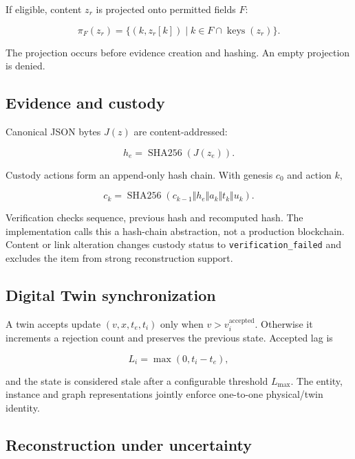 ﻿\documentclass[11pt,a4paper]{article}
\newcommand{\code}[1]{\texttt{#1}}
\begin{document}
If eligible, content $z_r$ is projected onto permitted fields $F$:

\begin{equation}
\pi_F(z_r)=\{(k,z_r[k])\mid k\in F\cap\operatorname{keys}(z_r)\}.
\end{equation}

The projection occurs before evidence creation and hashing. An empty projection is denied.

\subsection{Evidence and custody}

Canonical JSON bytes $J(z)$ are content-addressed:

\begin{equation}
h_e=\operatorname{SHA256}(J(z_e)).
\end{equation}

Custody actions form an append-only hash chain. With genesis $c_0$ and action $k$,

\begin{equation}
c_k=\operatorname{SHA256}(c_{k-1}\Vert h_e\Vert a_k\Vert t_k\Vert u_k).
\end{equation}

Verification checks sequence, previous hash and recomputed hash. The implementation calls this a hash-chain abstraction, not a production blockchain. Content or link alteration changes custody status to \code{verification\_failed} and excludes the item from strong reconstruction support.

\subsection{Digital Twin synchronization}

A twin accepts update $(v,x,t_e,t_i)$ only when $v>v_i^{\mathrm{accepted}}$. Otherwise it increments a rejection count and preserves the previous state. Accepted lag is

\begin{equation}
L_i=\max(0,t_i-t_e),
\end{equation}

and the state is considered stale after a configurable threshold $L_{\max}$. The entity, instance and graph representations jointly enforce one-to-one physical/twin identity.

\subsection{Reconstruction under uncertainty}
\end{document}
